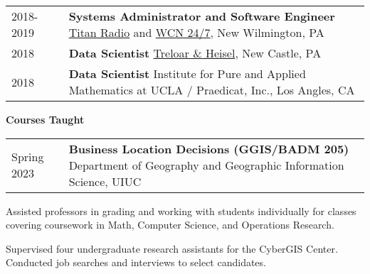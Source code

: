 \documentclass{acmcv}
\begin{document}

\begin{longtable}{p{0.16\linewidth} p{0.84\linewidth}}
    2018-2019 & \textbf{Systems Administrator and Software Engineer} \newline \href{http://titanradio.net/}{Titan Radio} and \href{https://www.wcn247.com/}{WCN 24/7}, New Wilmington, PA\\

    2018 & \textbf{Data Scientist} \newline \href{http://treloaronline.com/}{Treloar \& Heisel}, New Castle, PA\\

    2018 & \textbf{Data Scientist} \newline Institute for Pure and Applied Mathematics at UCLA / Praedicat, Inc., Los Angles, CA\\
\end{longtable}
    

    \textbf{Courses Taught}\vspace*{-0.25cm}

    \begin{longtable}{p{0.16\linewidth} p{0.84\linewidth}}
        Spring 2023 & \textbf{Business Location Decisions (GGIS/BADM 205)} \newline Department of Geography and Geographic Information Science, UIUC \\

    \end{longtable}

    \begin{titemize}
    	\titem Assisted professors in grading and working with students individually for classes covering coursework in Math, Computer Science, and Operations Research.
    \end{titemize}

    \begin{titemize}
        \titem Supervised four undergraduate research assistants for the CyberGIS Center.
        \titem Conducted job searches and interviews to select candidates.
    \end{titemize}
\end{document}

